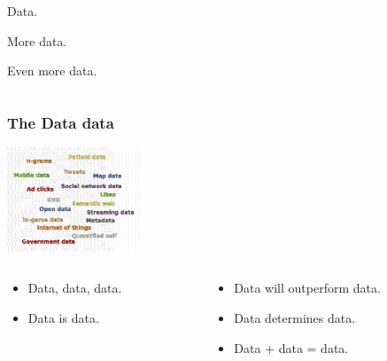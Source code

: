 \begin{frame}
\begin{center}
\begin{columns}
\begin{column}{0.5\textwidth}
Data.\\
\bigskip
\bigskip
\bigskip

More data.\\
\bigskip
\bigskip
\bigskip

Even more data.
\end{column}

\end{columns}

\end{center}

\end{frame}


\begin{frame}
\frametitle{The Data data}

\begin{center}
\includegraphics[width=0.3\textwidth]{graphics/data_cloud2.pdf}

\begin{columns}

\begin{column}{0.5\textwidth}
\begin{center}
\begin{itemize}
\item Data, data, data.
\item Data is data.
\end{itemize}
\end{center}
\end{column}

\begin{column}{0.5\textwidth}
\begin{itemize}
\item Data will outperform data.
\item Data determines data.
\item Data + data = data.
\end{itemize}
\end{column}

\end{columns}

\end{center}

\end{frame}

